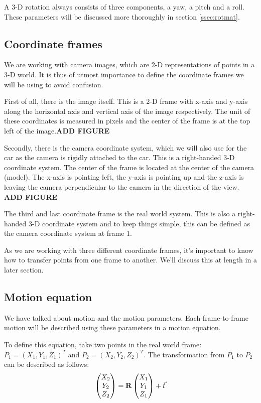 A 3-D rotation always consists of three components, a yaw, a pitch and a roll. These parameters will be discussed more thoroughly in section \autoref{ssec:rotmat}.

\subsection{Coordinate frames}
We are working with camera images, which are 2-D representations of points in a 3-D world. It is thus of utmost importance to define the coordinate frames we will be using to avoid confusion.\bigskip

First of all, there is the image itself. This is a 2-D frame with x-axis and y-axis along the horizontal axis and vertical axis of the image respectively. The unit of these coordinates is measured in pixels and the center of the frame is at the top left of the image.\textbf{ADD FIGURE}\bigskip

Secondly, there is the camera coordinate system, which we will also use for the car as the camera is rigidly attached to the car. This is a right-handed 3-D coordinate system. The center of the frame is located at the center of the camera (model). The x-axis is pointing left, the y-axis is pointing up and the z-axis is leaving the camera perpendicular to the camera in the direction of the view. \textbf{ADD FIGURE}\bigskip

The third and last coordinate frame is the real world system. This is also a right-handed 3-D coordinate system and to keep things simple, this can be defined as the camera coordinate system at frame 1.\bigskip

As we are working with three different coordinate frames, it's important to know how to transfer points from one frame to another. We'll discuss this at length in a later section.

\subsection{Motion equation}
We have talked about motion and the motion parameters. Each frame-to-frame motion will be described using these parameters in a motion equation.\bigskip

To define this equation, take two points in the real world frame: $P_1 = (X_1, Y_1, Z_1)^T$ and $P_2 = (X_2, Y_2, Z_2)^T$. The transformation from $P_1$ to $P_2$ can be described as follows:
\begin{equation}\label{eq:motion}
    \begin{pmatrix}
        X_2 \\ Y_2 \\ Z_2
    \end{pmatrix} =  \mathbf{R} \begin{pmatrix}
        X_1 \\ Y_1 \\ Z_1
    \end{pmatrix}+ \vec t
\end{equation}

